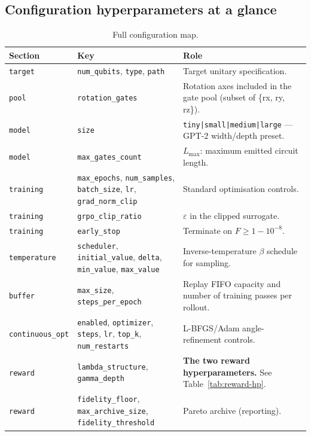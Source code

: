 \documentclass[11pt]{article}
\newcommand{\Lmax}{L_{\max}}
\begin{document}
\subsection{Configuration hyperparameters at a glance}

\begin{table}[h]
\centering
\small
\begin{tabular}{llp{8cm}}
\toprule
Section & Key & Role \\
\midrule
\texttt{target} & \texttt{num\_qubits}, \texttt{type}, \texttt{path} &
Target unitary specification. \\
\texttt{pool} & \texttt{rotation\_gates} & Rotation axes included in the
gate pool (subset of \{rx, ry, rz\}). \\
\texttt{model} & \texttt{size} & \texttt{tiny|small|medium|large} — GPT-2
width/depth preset. \\
\texttt{model} & \texttt{max\_gates\_count} & $\Lmax$: maximum emitted
circuit length. \\
\texttt{training} & \texttt{max\_epochs}, \texttt{num\_samples},
\texttt{batch\_size}, \texttt{lr}, \texttt{grad\_norm\_clip} &
Standard optimisation controls. \\
\texttt{training} & \texttt{grpo\_clip\_ratio} & $\varepsilon$ in the
clipped surrogate. \\
\texttt{training} & \texttt{early\_stop} & Terminate on $F\ge 1 - 10^{-8}$. \\
\texttt{temperature} & \texttt{scheduler}, \texttt{initial\_value},
\texttt{delta}, \texttt{min\_value}, \texttt{max\_value} &
Inverse-temperature $\beta$ schedule for sampling. \\
\texttt{buffer} & \texttt{max\_size}, \texttt{steps\_per\_epoch} &
Replay FIFO capacity and number of training passes per rollout. \\
\texttt{continuous\_opt} & \texttt{enabled}, \texttt{optimizer},
\texttt{steps}, \texttt{lr}, \texttt{top\_k}, \texttt{num\_restarts} &
L-BFGS/Adam angle-refinement controls. \\
\texttt{reward} & \texttt{lambda\_structure}, \texttt{gamma\_depth} &
\textbf{The two reward hyperparameters.} See Table~\ref{tab:reward-hp}. \\
\texttt{reward} & \texttt{fidelity\_floor}, \texttt{max\_archive\_size},
\texttt{fidelity\_threshold} & Pareto archive (reporting). \\
\bottomrule
\end{tabular}
\caption{Full configuration map.}
\end{table}
\end{document}

